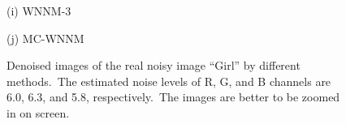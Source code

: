 \documentclass[10pt,onecolumn,letterpaper]{article}
\begin{document}
\begin{figure}[!htbp]
{\begin{minipage}[t]{0.3\textwidth}
{\footnotesize (i) WNNM-3   }
\end{minipage}
\begin{minipage}[t]{0.3\textwidth}
\centering
{}
{\footnotesize (j) MC-WNNM  }
\end{minipage}
}
\vspace{-1mm}
\caption{Denoised images of the real noisy image ``Girl'' \cite{ncwebsite} by different methods.\ The estimated noise levels of R, G, and B channels are 6.0, 6.3, and 5.8, respectively.\ The images are better to be zoomed in on screen.}
\label{f8}
\end{figure}
\end{document}
